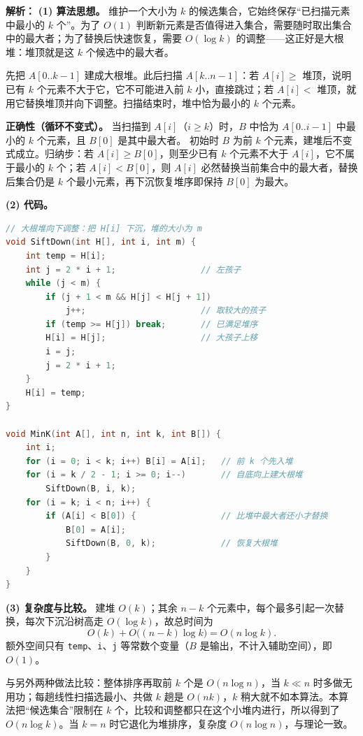\begin{enumerate}[start=7]
\ifshowsolutions\par\noindent\textbf{解析：} \textbf{(1) 算法思想。} 维护一个大小为 $k$ 的候选集合，它始终保存“已扫描元素中最小的 $k$ 个”。为了 $O(1)$ 判断新元素是否值得进入集合，需要随时取出集合中的最大者；为了替换后快速恢复，需要 $O(\log k)$ 的调整——这正好是大根堆：堆顶就是这 $k$ 个候选中的最大者。

先把 $A[0..k-1]$ 建成大根堆。此后扫描 $A[k..n-1]$：若 $A[i]\geqslant$ 堆顶，说明已有 $k$ 个元素不大于它，它不可能进入前 $k$ 小，直接跳过；若 $A[i]<$ 堆顶，就用它替换堆顶并向下调整。扫描结束时，堆中恰为最小的 $k$ 个元素。

\textbf{正确性（循环不变式）。} 当扫描到 $A[i]$（$i\geqslant k$）时，$B$ 中恰为 $A[0..i-1]$ 中最小的 $k$ 个元素，且 $B[0]$ 是其中最大者。
初始时 $B$ 为前 $k$ 个元素，建堆后不变式成立。归纳步：若 $A[i]\geqslant B[0]$，则至少已有 $k$ 个元素不大于 $A[i]$，它不属于最小的 $k$ 个；若 $A[i]<B[0]$，则 $A[i]$ 必然替换当前集合中的最大者，替换后集合仍是 $k$ 个最小元素，再下沉恢复堆序即保持 $B[0]$ 为最大。

\textbf{(2) 代码。}
\begin{lstlisting}[language=C]
// 大根堆向下调整：把 H[i] 下沉，堆的大小为 m
void SiftDown(int H[], int i, int m) {
    int temp = H[i];
    int j = 2 * i + 1;                 // 左孩子
    while (j < m) {
        if (j + 1 < m && H[j] < H[j + 1])
            j++;                       // 取较大的孩子
        if (temp >= H[j]) break;       // 已满足堆序
        H[i] = H[j];                   // 大孩子上移
        i = j;
        j = 2 * i + 1;
    }
    H[i] = temp;
}

void MinK(int A[], int n, int k, int B[]) {
    int i;
    for (i = 0; i < k; i++) B[i] = A[i];   // 前 k 个先入堆
    for (i = k / 2 - 1; i >= 0; i--)       // 自底向上建大根堆
        SiftDown(B, i, k);
    for (i = k; i < n; i++) {
        if (A[i] < B[0]) {                 // 比堆中最大者还小才替换
            B[0] = A[i];
            SiftDown(B, 0, k);             // 恢复大根堆
        }
    }
}
\end{lstlisting}

\textbf{(3) 复杂度与比较。} 建堆 $O(k)$；其余 $n-k$ 个元素中，每个最多引起一次替换，每次下沉沿树高走 $O(\log k)$，故总时间为
\[
O(k)+O\bigl((n-k)\log k\bigr)=O(n\log k).
\]
额外空间只有 \texttt{temp}、\texttt{i}、\texttt{j} 等常数个变量（$B$ 是输出，不计入辅助空间），即 $O(1)$。

与另外两种做法比较：整体排序再取前 $k$ 个是 $O(n\log n)$，当 $k\ll n$ 时多做无用功；每趟线性扫描选最小、共做 $k$ 趟是 $O(nk)$，$k$ 稍大就不如本算法。本算法把“候选集合”限制在 $k$ 个，比较和调整都只在这个小堆内进行，所以得到了 $O(n\log k)$。当 $k=n$ 时它退化为堆排序，复杂度 $O(n\log n)$，与理论一致。

\else \answerarea[10] \fi

\end{enumerate}
